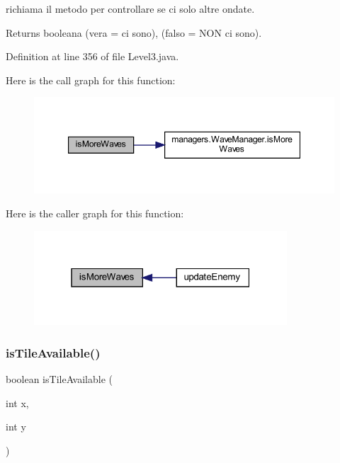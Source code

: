 richiama il metodo per controllare se ci solo altre ondate. 

\begin{DoxyReturn}{Returns}
booleana (vera = ci sono), (falso = N\+ON ci sono). 
\end{DoxyReturn}


Definition at line 356 of file Level3.\+java.

Here is the call graph for this function\+:
\nopagebreak
\begin{figure}[H]
\begin{center}
\leavevmode
\includegraphics[width=347pt]{classscenes_1_1_level3_a999f12a033f49f299ad7f55bcae24447_cgraph}
\end{center}
\end{figure}
Here is the caller graph for this function\+:\nopagebreak
\begin{figure}[H]
\begin{center}
\leavevmode
\includegraphics[width=268pt]{classscenes_1_1_level3_a999f12a033f49f299ad7f55bcae24447_icgraph}
\end{center}
\end{figure}
\mbox{\label{classscenes_1_1_level3_aaeac2ee6b3a920a21928ee7b3dc8e7a9}} 
\subsubsection{\texorpdfstring{is\+Tile\+Available()}{isTileAvailable()}}
{\footnotesize\ttfamily boolean is\+Tile\+Available (\begin{DoxyParamCaption}\item[{int}]{x,  }\item[{int}]{y }\end{DoxyParamCaption})\hspace{0.3cm}{\ttfamily [private]}}



